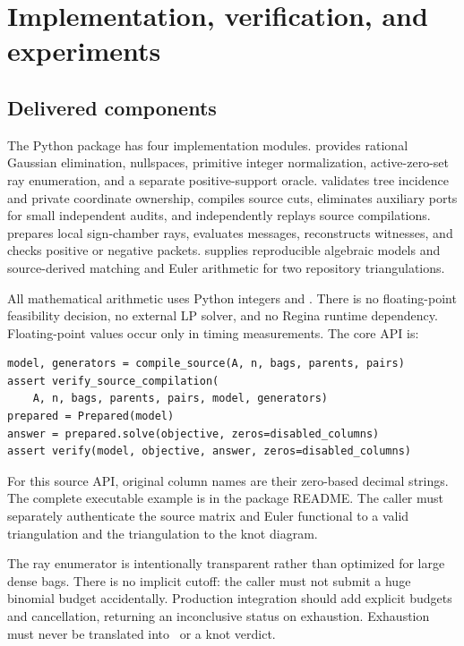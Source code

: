 \section{Implementation, verification, and experiments}
\label{sec:evidence}


\subsection{Delivered components}

The Python package has four implementation modules.  provides
rational Gaussian elimination, nullspaces, primitive integer normalization,
active-zero-set ray enumeration, and a separate positive-support oracle.
 validates tree incidence and private coordinate ownership,
compiles source cuts, eliminates auxiliary ports for small independent audits,
and independently replays source compilations.  prepares local
sign-chamber rays, evaluates messages, reconstructs witnesses, and checks
positive or negative packets.  supplies reproducible algebraic
models and source-derived matching and Euler arithmetic for two repository
triangulations.

All mathematical arithmetic uses Python integers and . There is
no floating-point feasibility decision, no external LP solver, and no Regina
runtime dependency. Floating-point values occur only in timing measurements.
The core API is:
\begin{verbatim}
model, generators = compile_source(A, n, bags, parents, pairs)
assert verify_source_compilation(
    A, n, bags, parents, pairs, model, generators)
prepared = Prepared(model)
answer = prepared.solve(objective, zeros=disabled_columns)
assert verify(model, objective, answer, zeros=disabled_columns)
\end{verbatim}
For this source API, original column names are their zero-based decimal strings.
The complete executable example is in the package README. The caller must
separately authenticate the source matrix and Euler functional to a valid
triangulation and the triangulation to the knot diagram.

The ray enumerator is intentionally transparent rather than optimized for
large dense bags. There is no implicit cutoff: the caller must not submit a
huge binomial budget accidentally. Production integration should add explicit
budgets and cancellation, returning an inconclusive status on exhaustion.
Exhaustion must never be translated into \nonpos\ or a knot verdict.

